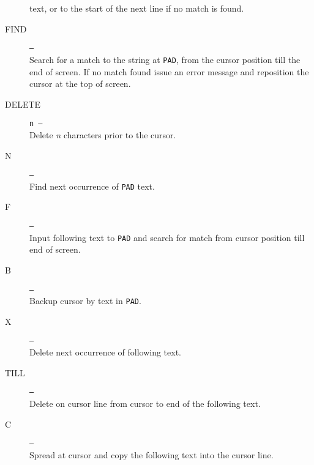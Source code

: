 \documentclass{article}
\newcommand{\n}{\textit{n}}
\begin{document}
\begin{multicols*}{2}[]
\begin{description}
			text, or to the start of the next line if no match is found.
		\item[FIND]\texttt{---}\\
			Search for a match to the string at \verb|PAD|, from the
			cursor position till the end of screen. If no match found
			issue an error message and reposition the cursor at the top
			of screen.
		\item[DELETE]\texttt{n ---}\\
			Delete \n{} characters prior to the cursor.
		\item[N]\texttt{---}\\
			Find next occurrence of \verb|PAD| text.
		\item[F]\texttt{---}\\
			Input following text to \verb|PAD| and search for match from
			cursor position till end of screen.
		\item[B]\texttt{---}\\
			Backup cursor by text in \verb|PAD|.
		\item[X]\texttt{---}\\
			Delete next occurrence of following text.
		\item[TILL]\texttt{---}\\
			Delete on cursor line from cursor to end of the following text.
		\item[C]\texttt{---}\\
			Spread at cursor and copy the following text into the cursor
			line.
	\end{description}

\end{multicols*}
\textbf{}
\end{document}
